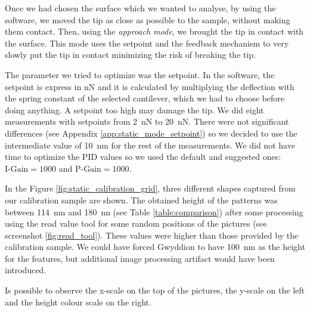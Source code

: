 \documentclass[11pt,a4paper]{article}
\begin{document}
Once we had chosen the surface which we wanted to analyse, by using the software, we moved the tip as close as possible to the sample, without making them contact. Then, using the \emph{approach mode}, we brought the tip in contact with the surface. This mode uses the setpoint and the feedback mechanism to very slowly put the tip in contact minimizing the risk of breaking the tip.

The parameter we tried to optimize was the setpoint. In the software, the setpoint is express in \si{\nano N} and it is calculated by multiplying the deflection with the spring constant of the selected cantilever, which we had to choose before doing anything. A setpoint too high may damage the tip. We did eight measurements with setpoints from \SI{2}{\nano N} to \SI{20}{\nano N}. There were not significant differences (see Appendix \ref{app:static_mode_setpoint}) so we decided to use the intermediate value of \SI{10}{\nano\m} for the rest of the measurements. We did not have time to optimize the PID values so we used the default and suggested ones: $\text{I-Gain}=1000$ and $\text{P-Gain}=1000$.

In the Figure \ref{fig:static_calibration_grid}, three different shapes captured from our calibration sample are shown. The obtained height of the patterns was between \SI{114}{\nano m} and \SI{180}{\nano n} (see Table \ref{table:comparison}) after some processing using the read value tool for some random positions of the pictures (see screenshot \ref{fig:read_tool}). These values were higher than those provided by the calibration sample. We could have forced Gwyddion to have \SI{100}{\nano m} as the height for the features, but additional image processing artifact would have been introduced.

Is possible to observe the x-scale on the top of the pictures, the y-scale on the left and the height colour scale on the right.
\end{document}
